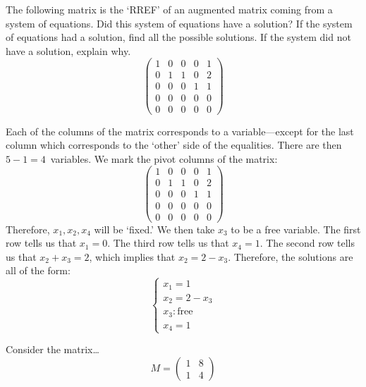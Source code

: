 \documentclass[11pt,letterpaper]{article}
\begin{document}

 The following matrix is the `RREF' of an augmented matrix coming from a system of equations. Did this system of equations have a solution? If the system of equations had a solution, find all the possible solutions. If the system did not have a solution, explain why. 
	\[
	\begin{pmatrix}
	1 & 0 & 0 & 0 & 1 \\
	0 & 1 & 1 & 0 & 2 \\
	0 & 0 & 0 & 1 & 1 \\
	0 & 0 & 0 & 0 & 0 \\
	0 & 0 & 0 & 0 & 0 
	\end{pmatrix}
	\] \pspace

\sol Each of the columns of the matrix corresponds to a variable---except for the last column which corresponds to the `other' side of the equalities. There are then $5 - 1= 4$~variables. We mark the pivot columns of the matrix: 
	\[
	\begin{pmatrix}
	\boxed{1} & 0 & 0 & 0 & 1 \\
	0 & \boxed{1} & 1 & 0 & 2 \\
	0 & 0 & 0 & \boxed{1} & 1 \\
	0 & 0 & 0 & 0 & 0 \\
	0 & 0 & 0 & 0 & 0 
	\end{pmatrix}
	\]
Therefore, $x_1, x_2, x_4$ will be `fixed.' We then take $x_3$ to be a free variable. The first row tells us that $x_1= 0$. The third row tells us that $x_4= 1$. The second row tells us that $x_2 + x_3= 2$, which implies that $x_2= 2 - x_3$. Therefore, the solutions are all of the form:
	\[
	\begin{cases}
	x_1= 1 \\
	x_2= 2 - x_3 \\
	x_3 \colon \text{free} \\
	x_4= 1 
	\end{cases}
	\]



\newpage



 Consider the matrix\dots
	\[
	M= \begin{pmatrix} 1 & 8 \\ 1 & 4 \end{pmatrix}
	\] 
\end{document}
